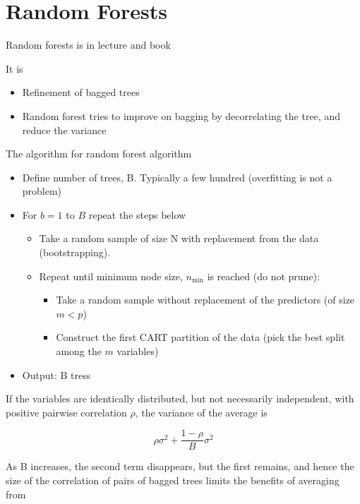 \section{Random Forests}

Random forests is in lecture \cite[p.~33]{lecture9} and book \cite[p.~587]{friedman2016elements} 

It is 

\begin{itemize}
  \item Refinement of bagged trees
  \item Random forest tries to improve on bagging by decorrelating the tree, and reduce the variance
\end{itemize}

The algorithm for random forest algorithm

\begin{itemize}
  \item Define number of trees, B. Typically a few hundred (overfitting is not a problem)
  \item For $b=1$ to $B$ repeat the steps below
  \begin{itemize}
    \item Take a random sample of size N with replacement from the data (bootstrapping).
    \item Repeat until minimum node size, $n_{\text{min}}$ is reached (do not prune):
        \begin{itemize}
          \item Take a random sample without replacement of the predictors (of size $m < p$)
          \item Construct the first CART partition of the data (pick the best split among the $m$ variables)
        \end{itemize}
  \end{itemize}
  \item Output: B tress
\end{itemize}

If the variables are identically distributed, but not necessarily independent, with positive pairwise correlation $\rho$, the variance of the average is 

\[
    \rho \sigma^2 + \frac{1 - \rho}{B} \sigma^2
\] 

As B increases, the second term disappears, but the first remains, and hence the size of the correlation of pairs of bagged trees limits the benefits of averaging from  \cite[p.~588]{friedman2016elements} 


